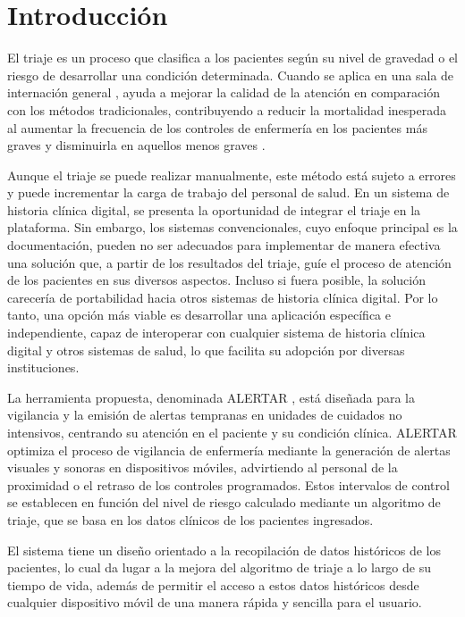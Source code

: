 
\chapter{Introducción}\label{cap:intro}

El triaje es un proceso que clasifica a los pacientes según su nivel de gravedad o el riesgo de desarrollar una condición determinada. Cuando se aplica en una sala de internación general \cite{bancomundial_enfermeras_parteras}, ayuda a mejorar la calidad de la atención en comparación con los métodos tradicionales, contribuyendo a reducir la mortalidad inesperada al aumentar la frecuencia de los controles de enfermería en los pacientes más graves y disminuirla en aquellos menos graves \cite{liao2020novel,lee2018systematic}.

Aunque el triaje se puede realizar manualmente, este método está sujeto a errores y puede incrementar la carga de trabajo del personal de salud. En un sistema de historia clínica digital, se presenta la oportunidad de integrar el triaje en la plataforma. Sin embargo, los sistemas convencionales, cuyo enfoque principal es la documentación, pueden no ser adecuados para implementar de manera efectiva una solución que, a partir de los resultados del triaje, guíe el proceso de atención de los pacientes en sus diversos aspectos. Incluso si fuera posible, la solución carecería de portabilidad hacia otros sistemas de historia clínica digital. Por lo tanto, una opción más viable es desarrollar una aplicación específica e independiente, capaz de interoperar con cualquier sistema de historia clínica digital y otros sistemas de salud, lo que facilita su adopción por diversas instituciones.

La herramienta propuesta, denominada ALERTAR \cite{latorre2024alertar}, está diseñada para la vigilancia y la emisión de alertas tempranas en unidades de cuidados no intensivos, centrando su atención en el paciente y su condición clínica. ALERTAR optimiza el proceso de vigilancia de enfermería mediante la generación de alertas visuales y sonoras en dispositivos móviles, advirtiendo al personal de la proximidad o el retraso de los controles programados. Estos intervalos de control se establecen en función del nivel de riesgo calculado mediante un algoritmo de triaje, que se basa en los datos clínicos de los pacientes ingresados.

El sistema tiene un diseño orientado a la recopilación de datos históricos de los pacientes, lo cual da lugar a la mejora del algoritmo de triaje a lo largo de su tiempo de vida, además de permitir el acceso a estos datos históricos desde cualquier dispositivo móvil de una manera rápida y sencilla para el usuario.

